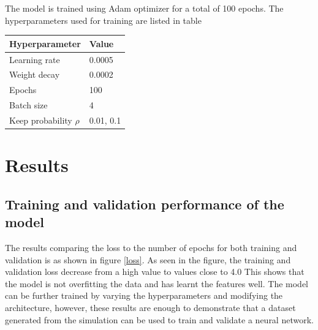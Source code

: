 \documentclass[a4paper, 12pt, oneside, BCOR1cm,toc=chapterentrywithdots]{scrbook}
\begin{document}
The model is trained using Adam optimizer \cite{kingma2014adam} for a total of 100 epochs. The hyperparameters used for training are listed in table  

\begin{center}
\label{enet}
\begin{tabular}{| l | l |}
\hline
Hyperparameter & Value \\
\hline
Learning rate & 0.0005\\
Weight decay & 0.0002\\
Epochs & 100\\
Batch size & 4\\
Keep probability $\rho$ & 0.01, 0.1\\
\hline
\end{tabular}
\end{center}


\chapter{Results}

\section{Training and validation performance of the model}

The results comparing the loss to the number of epochs for both training and validation is as shown in figure \ref{loss}. As seen in the figure, the training and validation loss decrease from a high value to values close to 4.0 This shows that the model is not overfitting the data and has learnt the features well. The model can be further trained by varying the hyperparameters and modifying the architecture, however, these results are enough to demonstrate that a dataset generated from the simulation can be used to train and validate a neural network.
\end{document}
